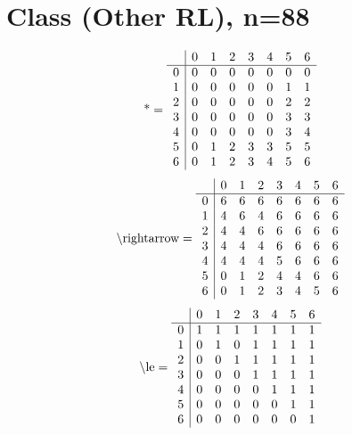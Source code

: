\documentclass[11pt]{article}
\begin{document}
\section{Class (Other RL), n=88}
\[\text{*} = 
\begin{array}{r | r r r r r r r}
 & 0 & 1 & 2 & 3 & 4 & 5 & 6 \\ \hline
0 & 0 & 0 & 0 & 0 & 0 & 0 & 0 \\
1 & 0 & 0 & 0 & 0 & 0 & 1 & 1 \\
2 & 0 & 0 & 0 & 0 & 0 & 2 & 2 \\
3 & 0 & 0 & 0 & 0 & 0 & 3 & 3 \\
4 & 0 & 0 & 0 & 0 & 0 & 3 & 4 \\
5 & 0 & 1 & 2 & 3 & 3 & 5 & 5 \\
6 & 0 & 1 & 2 & 3 & 4 & 5 & 6 \\
\end{array}
\]
\[\text{\textbackslash rightarrow} = 
\begin{array}{r | r r r r r r r}
 & 0 & 1 & 2 & 3 & 4 & 5 & 6 \\ \hline
0 & 6 & 6 & 6 & 6 & 6 & 6 & 6 \\
1 & 4 & 6 & 4 & 6 & 6 & 6 & 6 \\
2 & 4 & 4 & 6 & 6 & 6 & 6 & 6 \\
3 & 4 & 4 & 4 & 6 & 6 & 6 & 6 \\
4 & 4 & 4 & 4 & 5 & 6 & 6 & 6 \\
5 & 0 & 1 & 2 & 4 & 4 & 6 & 6 \\
6 & 0 & 1 & 2 & 3 & 4 & 5 & 6 \\
\end{array}
\]
\[\text{\textbackslash le} = 
\begin{array}{r | r r r r r r r}
 & 0 & 1 & 2 & 3 & 4 & 5 & 6 \\ \hline
0 & 1 & 1 & 1 & 1 & 1 & 1 & 1 \\
1 & 0 & 1 & 0 & 1 & 1 & 1 & 1 \\
2 & 0 & 0 & 1 & 1 & 1 & 1 & 1 \\
3 & 0 & 0 & 0 & 1 & 1 & 1 & 1 \\
4 & 0 & 0 & 0 & 0 & 1 & 1 & 1 \\
5 & 0 & 0 & 0 & 0 & 0 & 1 & 1 \\
6 & 0 & 0 & 0 & 0 & 0 & 0 & 1 \\
\end{array}
\]
\end{document}
